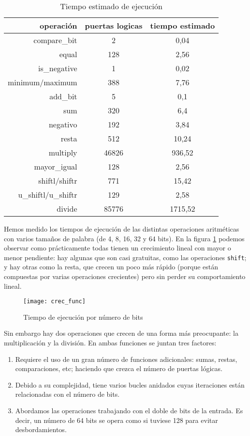 \begin{table}[]
    \centering
    \begin{tabular}{r | cc}
        operación       & puertas logicas       & tiempo estimado \\
        \hline \hline
        compare\_bit     & 2     & 0,04 \\
        equal   & 128   & 2,56 \\
        is\_negative     & 1     & 0,02 \\
        minimum/maximum & 388   & 7,76 \\
        add\_bit & 5     & 0,1 \\
        sum     & 320   & 6,4 \\
        negativo        & 192   & 3,84 \\
        resta   & 512   & 10,24 \\
        multiply        & 46826 & 936,52 \\
        mayor\_igual     & 128   & 2,56 \\
        shiftl/shiftr   & 771   & 15,42 \\
        u\_shiftl/u\_shiftr       & 129   & 2,58 \\
        divide  & 85776 & 1715,52 \\
    \end{tabular}
    \caption{Tiempo estimado de ejecución}
    \label{table:time_by_gates}
\end{table}

Hemos medido los tiempos de ejecución de las distintas operaciones aritméticas con varios tamaños de palabra (de 4, 8, 16, 32 y 64 bits). En la figura \ref{fig:crec_func} podemos observar como prácticamente todas tienen un crecimiento lineal con mayor o menor pendiente: hay algunas que son casi gratuitas, como las operaciones \verb|shift|; y hay otras como la resta, que crecen un poco más rápido (porque están compuestas por varias operaciones crecientes) pero sin perder su comportamiento lineal.

\begin{figure}[h]
    \texttt{[image: crec\_func]}
    \caption{Tiempo de ejecución por número de bits}
    \label{fig:crec_func}
\end{figure}

Sin embargo hay dos operaciones que crecen de una forma más preocupante: la multiplicación y la división. En ambas funciones se juntan tres factores:

\begin{enumerate}
    \item Requiere el uso de un gran número de funciones adicionales: sumas, restas, comparaciones, etc; haciendo que crezca el número de puertas lógicas.
    \item Debido a su complejidad, tiene varios bucles anidados cuyas iteraciones están relacionadas con el número de bits.
    \item Abordamos las operaciones trabajando con el doble de bits de la entrada. Es decir, un número de 64 bits se opera como si tuviese 128 para evitar desbordamientos.
\end{enumerate}

